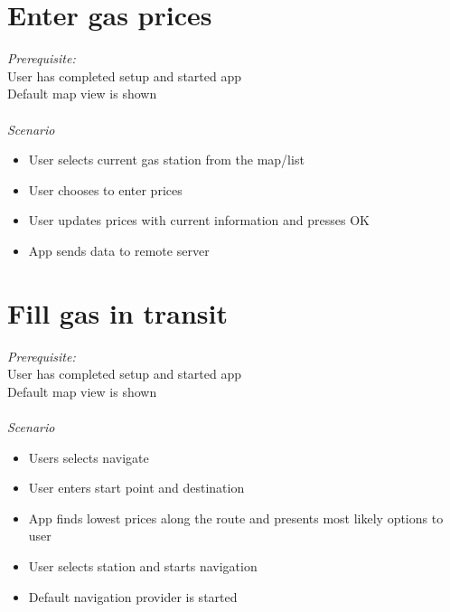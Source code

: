\section{Enter gas prices}
\emph{Prerequisite:}\\
User has completed setup and started app\\
Default map view is shown \\
\\
\emph{Scenario}
\begin{itemize}
	\item User selects current gas station from the map/list
\item User chooses to enter prices
\item User updates prices with current information and presses OK
\item App sends data to remote server
\end{itemize}

\section{Fill gas in transit}
\emph{Prerequisite:}\\
User has completed setup and started app\\
Default map view is shown\\
\\
\emph{Scenario}
\begin{itemize}
	\item Users selects navigate
\item User enters start point and destination
\item App finds lowest prices along the route and presents most likely options to user
\item User selects station and starts navigation
\item Default navigation provider is started

\end{itemize}

